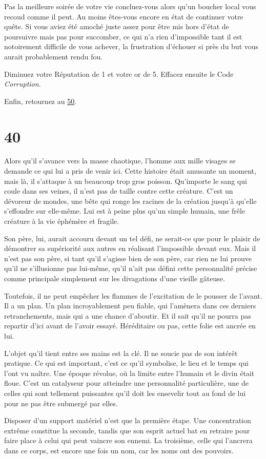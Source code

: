 \documentclass{report}
\newcommand{\gsection}[1]{
    \section{#1}
    \label{section-#1}
}
\newcommand{\glink}[1]{\hyperref[section-#1]{#1}}
\begin{document}
Pas la meilleure soirée de votre vie concluez-vous alors qu'un boucher local vous recoud comme il peut. Au moins êtes-vous encore en état de continuer votre quête. Si vous aviez été amoché juste assez pour être mis hors d'état de poursuivre mais pas pour succomber, ce qui n'a rien d'impossible tant il est notoirement difficile de vous achever, la frustration d'échouer si près du but vous aurait probablement rendu fou.

Diminuez votre Réputation de 1 et votre or de 5. Effacez ensuite le Code \emph{Corruption}.

Enfin, retournez au \glink{50}.

\gsection{40}

Alors qu'il s'avance vers la masse chaotique, l'homme aux mille visages se demande ce qui lui a pris de venir ici. Cette histoire était amusante un moment, mais là, il s'attaque à un beaucoup trop gros poisson. Qu'importe le sang qui coule dans ses veines, il n'est pas de taille contre cette créature. C'est un dévoreur de mondes, une bête qui ronge les racines de la création jusqu'à qu'elle s'effondre sur elle-même. Lui est à peine plus qu'un simple humain, une frêle créature à la vie éphémère et fragile.

Son père, lui, aurait accouru devant un tel défi, ne serait-ce que pour le plaisir de démontrer sa supériorité aux autres en réalisant l'impossible devant eux. Mais il n'est pas son père, si tant qu'il s'agisse bien de son père, car rien ne lui prouve qu'il ne s'illusionne pas lui-même, qu'il n'ait pas défini cette personnalité précise comme principale simplement sur les divagations d'une vieille gâteuse.

Toutefois, il ne peut empêcher les flammes de l'excitation de le pousser de l'avant. Il a un plan. Un plan incroyablement peu fiable, qui l'amènera dans ces derniers retranchements, mais qui a une chance d'aboutir. Et il sait qu'il ne pourra pas repartir d'ici avant de l'avoir essayé. Héréditaire ou pas, cette folie est ancrée en lui.

L'objet qu'il tient entre ses mains est la clé. Il ne soucie pas de son intérêt pratique. Ce qui est important, c'est ce qu'il symbolise, le lieu et le temps qui l'ont vu naître. Une époque révolue, où la limite entre l'humain et le divin était floue. C'est un catalyseur pour atteindre une personnalité particulière, une de celles qui sont tellement puissantes qu'il doit les ensevelir tout au fond de lui pour ne pas être submergé par elles.

Disposer d'un support matériel n'est que la première étape. Une concentration extrême constitue la seconde, tandis que son esprit actuel bat en retraire pour faire place à celui qui peut vaincre son ennemi. La troisième, celle qui l'ancrera dans ce corps, est encore une fois un nom, car les noms ont des pouvoirs.
\end{document}
